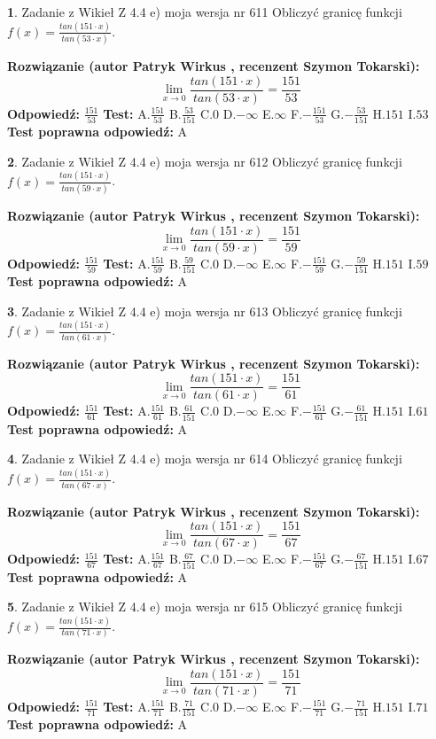 \documentclass[12pt, a4paper]{article}
\theoremstyle{definition} %
\newtheorem{zad}{}
\newcommand{\zadStart}[1]{\begin{zad}#1\newline}
\newcommand{\zadStop}{\end{zad}}
\newcommand{\rozwStart}[2]{\noindent \textbf{Rozwiązanie (autor #1 , recenzent #2): }\newline}
\newcommand{\rozwStop}{\newline}
\newcommand{\odpStart}{\noindent \textbf{Odpowiedź:}\newline}
\newcommand{\odpStop}{\newline}
\newcommand{\testStart}{\noindent \textbf{Test:}\newline}
\newcommand{\testStop}{\newline}
\newcommand{\kluczStart}{\noindent \textbf{Test poprawna odpowiedź:}\newline}
\newcommand{\kluczStop}{\newline}
\begin{document}
\zadStart{Zadanie z Wikieł Z 4.4 e) moja wersja nr 611}
Obliczyć granicę funkcji $f(x)=\frac{tan(151\cdot x)}{tan(53\cdot x)}$.
\zadStop
\rozwStart{Patryk Wirkus}{Szymon Tokarski}
$$\lim\limits_{x\to 0}\frac{tan(151\cdot x)}{tan(53\cdot x)}=
\frac{151}{53}$$
\rozwStop
\odpStart
$\frac{151}{53}$
\odpStop
\testStart
A.$\frac{151}{53}$
B.$\frac{53}{151}$
C.$0$
D.$-\infty$
E.$\infty$
F.$-\frac{151}{53}$
G.$-\frac{53}{151}$
H.$151$
I.$53$
\testStop
\kluczStart
A
\kluczStop



\zadStart{Zadanie z Wikieł Z 4.4 e) moja wersja nr 612}
Obliczyć granicę funkcji $f(x)=\frac{tan(151\cdot x)}{tan(59\cdot x)}$.
\zadStop
\rozwStart{Patryk Wirkus}{Szymon Tokarski}
$$\lim\limits_{x\to 0}\frac{tan(151\cdot x)}{tan(59\cdot x)}=
\frac{151}{59}$$
\rozwStop
\odpStart
$\frac{151}{59}$
\odpStop
\testStart
A.$\frac{151}{59}$
B.$\frac{59}{151}$
C.$0$
D.$-\infty$
E.$\infty$
F.$-\frac{151}{59}$
G.$-\frac{59}{151}$
H.$151$
I.$59$
\testStop
\kluczStart
A
\kluczStop



\zadStart{Zadanie z Wikieł Z 4.4 e) moja wersja nr 613}
Obliczyć granicę funkcji $f(x)=\frac{tan(151\cdot x)}{tan(61\cdot x)}$.
\zadStop
\rozwStart{Patryk Wirkus}{Szymon Tokarski}
$$\lim\limits_{x\to 0}\frac{tan(151\cdot x)}{tan(61\cdot x)}=
\frac{151}{61}$$
\rozwStop
\odpStart
$\frac{151}{61}$
\odpStop
\testStart
A.$\frac{151}{61}$
B.$\frac{61}{151}$
C.$0$
D.$-\infty$
E.$\infty$
F.$-\frac{151}{61}$
G.$-\frac{61}{151}$
H.$151$
I.$61$
\testStop
\kluczStart
A
\kluczStop



\zadStart{Zadanie z Wikieł Z 4.4 e) moja wersja nr 614}
Obliczyć granicę funkcji $f(x)=\frac{tan(151\cdot x)}{tan(67\cdot x)}$.
\zadStop
\rozwStart{Patryk Wirkus}{Szymon Tokarski}
$$\lim\limits_{x\to 0}\frac{tan(151\cdot x)}{tan(67\cdot x)}=
\frac{151}{67}$$
\rozwStop
\odpStart
$\frac{151}{67}$
\odpStop
\testStart
A.$\frac{151}{67}$
B.$\frac{67}{151}$
C.$0$
D.$-\infty$
E.$\infty$
F.$-\frac{151}{67}$
G.$-\frac{67}{151}$
H.$151$
I.$67$
\testStop
\kluczStart
A
\kluczStop



\zadStart{Zadanie z Wikieł Z 4.4 e) moja wersja nr 615}
Obliczyć granicę funkcji $f(x)=\frac{tan(151\cdot x)}{tan(71\cdot x)}$.
\zadStop
\rozwStart{Patryk Wirkus}{Szymon Tokarski}
$$\lim\limits_{x\to 0}\frac{tan(151\cdot x)}{tan(71\cdot x)}=
\frac{151}{71}$$
\rozwStop
\odpStart
$\frac{151}{71}$
\odpStop
\testStart
A.$\frac{151}{71}$
B.$\frac{71}{151}$
C.$0$
D.$-\infty$
E.$\infty$
F.$-\frac{151}{71}$
G.$-\frac{71}{151}$
H.$151$
I.$71$
\testStop
\kluczStart
A
\kluczStop
\end{document}
